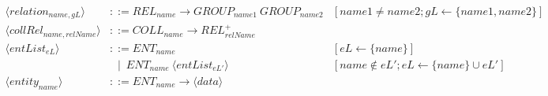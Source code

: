 \begin{landscape}
\begin{adjustbox}{max width=\linewidth,max height=.95\textheight,valign=c}
{\begin{align}
                \langle relation_{name, gL} \rangle          & ::= REL_{name} \to GROUP_{name1} ~ GROUP_{name2}                                                             & [name1 \neq name2; gL \gets \{name1, name2\}]                                                          \\
                \langle collRel_{name,relName} \rangle       & ::= COLL_{name} \to REL_{relName}^+                                                                                                                                                                                   \\[1em]
                \langle entList_{eL} \rangle                 & ::= ENT_{name}                                                                                               & [eL \gets \{name\}]                                                                                    \\
                                                             & ~~ \mid ~ ENT_{name} ~ \langle entList_{eL'} \rangle                                                         & [name \notin eL'; eL \gets \{name\} \cup eL']                                                          \\
                \langle entity_{name} \rangle                & ::= ENT_{name} \to \langle data \rangle
            \end{align}}
    \end{adjustbox}
\end{landscape}

